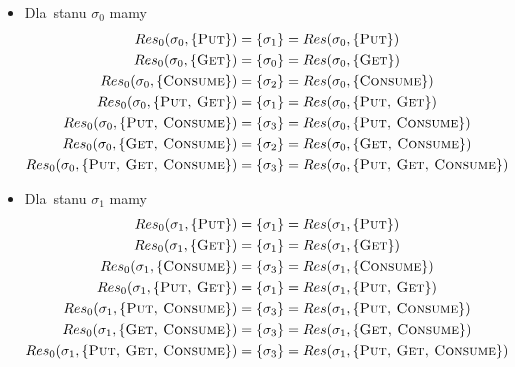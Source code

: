 \documentclass[11pt,a4paper]{article}
\begin{document}
\begin{itemize}
    \item Dla~stanu $\sigma_0$ mamy
    \begin{align*}
        Res_0(\sigma_0, \{ \textsc{Put} \}) &= \{ \sigma_1 \} = Res(\sigma_0, \{ \textsc{Put} \}) \\
        Res_0(\sigma_0, \{ \textsc{Get} \}) &= \{ \sigma_0 \} = Res(\sigma_0, \{ \textsc{Get} \}) \\
        Res_0(\sigma_0, \{ \textsc{Consume} \}) &= \{ \sigma_2 \} = Res(\sigma_0, \{ \textsc{Consume} \}) \\
        Res_0(\sigma_0, \{ \textsc{Put, Get} \}) &= \{ \sigma_1 \} = Res(\sigma_0, \{ \textsc{Put, Get} \}) \\
        Res_0(\sigma_0, \{ \textsc{Put, Consume} \}) &= \{ \sigma_3 \} = Res(\sigma_0, \{ \textsc{Put, Consume} \}) \\
        Res_0(\sigma_0, \{ \textsc{Get, Consume} \}) &= \{ \sigma_2 \} = Res(\sigma_0, \{ \textsc{Get, Consume} \}) \\
        Res_0(\sigma_0, \{ \textsc{Put, Get, Consume} \}) &= \{ \sigma_3 \} = Res(\sigma_0, \{ \textsc{Put, Get, Consume} \})
    \end{align*}
    
    \item Dla~stanu $\sigma_1$ mamy
    \begin{align*}
        Res_0(\sigma_1, \{ \textsc{Put} \}) &= \{ \sigma_1 \} = Res(\sigma_1, \{ \textsc{Put} \}) \\
        Res_0(\sigma_1, \{ \textsc{Get} \}) &= \{ \sigma_1 \} = Res(\sigma_1, \{ \textsc{Get} \}) \\
        Res_0(\sigma_1, \{ \textsc{Consume} \}) &= \{ \sigma_3 \} = Res(\sigma_1, \{ \textsc{Consume} \}) \\
        Res_0(\sigma_1, \{ \textsc{Put, Get} \}) &= \{ \sigma_1 \} = Res(\sigma_1, \{ \textsc{Put, Get} \}) \\
        Res_0(\sigma_1, \{ \textsc{Put, Consume} \}) &= \{ \sigma_3 \} = Res(\sigma_1, \{ \textsc{Put, Consume} \}) \\
        Res_0(\sigma_1, \{ \textsc{Get, Consume} \}) &= \{ \sigma_3 \} = Res(\sigma_1, \{ \textsc{Get, Consume} \}) \\
        Res_0(\sigma_1, \{ \textsc{Put, Get, Consume} \}) &= \{ \sigma_3 \} = Res(\sigma_1, \{ \textsc{Put, Get, Consume} \})
    \end{align*}
    

\end{itemize}
\end{document}
